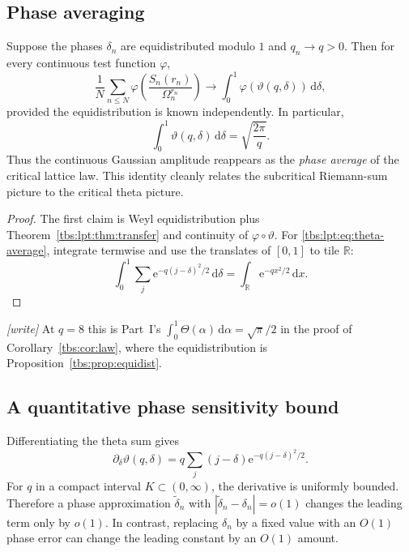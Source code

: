 \documentclass[11pt,a4paper]{article}
\numberwithin{equation}{section}
\theoremstyle{definition}
\newcommand{\R}{\mathbb R}
\newcommand{\dd}{\,\mathrm d}
\newcommand{\ee}{\mathrm e}
\begin{document}
\subsection{Phase averaging}\label{tbs:lpt:sec:phase-average}
Suppose the phases $\delta_n$ are equidistributed modulo $1$ and
$q_n\to q>0$. Then for every continuous test function $\varphi$,
\begin{equation}\label{tbs:lpt:eq:phase-average}
 \frac1N\sum_{n\le N}
 \varphi\!\left(\frac{S_n(r_n)}{\Omega_n^{r_n}}\right)
 \longrightarrow\int_0^1\varphi(\vartheta(q,\delta))\dd\delta,
\end{equation}
provided the equidistribution is known independently. In particular,
\begin{equation}\label{tbs:lpt:eq:theta-average}
 \int_0^1\vartheta(q,\delta)\dd\delta=\sqrt{\frac{2\pi}{q}}.
\end{equation}
Thus the continuous Gaussian amplitude reappears as the \emph{phase
average} of the critical lattice law. This identity cleanly relates the
subcritical Riemann-sum picture to the critical theta picture.

\begin{proof}
The first claim is Weyl equidistribution plus
Theorem~\ref{tbs:lpt:thm:transfer} and continuity of
$\varphi\circ\vartheta$. For \eqref{tbs:lpt:eq:theta-average}, integrate
termwise and use the translates of $[0,1]$ to tile $\R$:
\[
 \int_0^1\sum_j\ee^{-q(j-\delta)^2/2}\dd\delta
 =\int_\R\ee^{-qx^2/2}\dd x.
\]
\end{proof}

\emph{[write]} At $q=8$ this is Part~I's
$\int_0^1\Theta(\alpha)\dd\alpha=\sqrt\pi/2$ in the proof of
Corollary~\ref{tbs:cor:law}, where the equidistribution is
Proposition~\ref{tbs:prop:equidist}.

\subsection{A quantitative phase sensitivity bound}\label{tbs:lpt:sec:sensitivity}
Differentiating the theta sum gives
\[
 \partial_\delta\vartheta(q,\delta)
 =q\sum_j(j-\delta)\ee^{-q(j-\delta)^2/2}.
\]
For $q$ in a compact interval $K\subset(0,\infty)$, the derivative is
uniformly bounded. Therefore a phase approximation $\widetilde\delta_n$
with $|\widetilde\delta_n-\delta_n|=o(1)$ changes the leading term only by
$o(1)$. In contrast, replacing $\delta_n$ by a fixed value with an $O(1)$
phase error can change the leading constant by an $O(1)$ amount.
\end{document}
